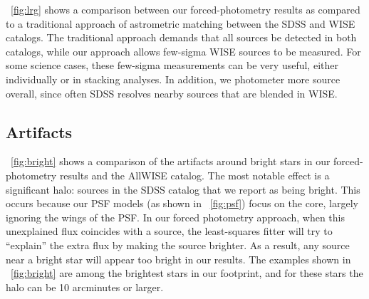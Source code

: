 \documentclass[12pt,preprint]{aastex}
\newcommand{\figref}[1]{\figurename~\ref{#1}}
\newcommand{\Figref}[1]{\figref{#1}}
\begin{document}
\Figref{fig:lrg} shows a comparison between our forced-photometry
results as compared to a traditional approach of astrometric matching
between the SDSS and WISE catalogs.  The traditional approach demands
that all sources be detected in both catalogs, while our approach
allows few-sigma WISE sources to be measured.  For some science cases,
these few-sigma measurements can be very useful, either individually
or in stacking analyses.  In addition, we photometer more source
overall, since often SDSS resolves nearby sources that are blended in
WISE.

\subsection{Artifacts}

\Figref{fig:bright} shows a comparison of the artifacts around bright
stars in our forced-photometry results and the AllWISE catalog.  The
most notable effect is a significant halo: sources in the SDSS catalog
that we report as being bright.  This occurs because our PSF models
(as shown in \figref{fig:psf}) focus on the core, largely ignoring the
wings of the PSF.  In our forced photometry approach, when this
unexplained flux coincides with a source, the least-squares fitter
will try to ``explain'' the extra flux by making the source brighter.
As a result, any source near a bright star will appear too bright in our
results.  The examples shown in \figref{fig:bright} are among the
brightest stars in our footprint, and for these stars the halo can be
10 arcminutes or larger.
\end{document}
